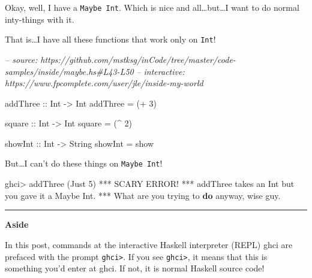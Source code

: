 \documentclass[]{article}
\newenvironment{Shaded}{}{}
\newcommand{\CommentTok}[1]{\textcolor[rgb]{0.38,0.63,0.69}{\textit{#1}}}
\newcommand{\DataTypeTok}[1]{\textcolor[rgb]{0.56,0.13,0.00}{#1}}
\newcommand{\DecValTok}[1]{\textcolor[rgb]{0.25,0.63,0.44}{#1}}
\newcommand{\FunctionTok}[1]{\textcolor[rgb]{0.02,0.16,0.49}{#1}}
\newcommand{\KeywordTok}[1]{\textcolor[rgb]{0.00,0.44,0.13}{\textbf{#1}}}
\newcommand{\NormalTok}[1]{#1}
\newcommand{\OtherTok}[1]{\textcolor[rgb]{0.00,0.44,0.13}{#1}}
\begin{document}
Okay, well, I have a \texttt{Maybe\ Int}. Which is nice and
all\ldots{}but\ldots{}I want to do normal inty-things with it.

That is\ldots{}I have all these functions that work only on \texttt{Int}!

\begin{Shaded}
\begin{Highlighting}[]
\CommentTok{-- source: https://github.com/mstksg/inCode/tree/master/code-samples/inside/maybe.hs#L43-L50}
\CommentTok{-- interactive: https://www.fpcomplete.com/user/jle/inside-my-world}

\OtherTok{addThree ::} \DataTypeTok{Int} \OtherTok{->} \DataTypeTok{Int}
\NormalTok{addThree }\FunctionTok{=}\NormalTok{ (}\FunctionTok{+} \DecValTok{3}\NormalTok{)}

\OtherTok{square ::} \DataTypeTok{Int} \OtherTok{->} \DataTypeTok{Int}
\NormalTok{square }\FunctionTok{=}\NormalTok{ (}\FunctionTok{^} \DecValTok{2}\NormalTok{)}

\NormalTok{showInt}\OtherTok{ ::} \DataTypeTok{Int} \OtherTok{->} \DataTypeTok{String}
\NormalTok{showInt }\FunctionTok{=}\NormalTok{ show}
\end{Highlighting}
\end{Shaded}

But\ldots{}I can't do these things on \texttt{Maybe\ Int}!

\begin{Shaded}
\begin{Highlighting}[]
\NormalTok{ghci}\FunctionTok{>}\NormalTok{ addThree (}\DataTypeTok{Just} \DecValTok{5}\NormalTok{)}
\FunctionTok{***} \DataTypeTok{SCARY} \DataTypeTok{ERROR}\FunctionTok{!}
\FunctionTok{***}\NormalTok{ addThree takes an }\DataTypeTok{Int}\NormalTok{ but you gave it a }\DataTypeTok{Maybe} \DataTypeTok{Int}\FunctionTok{.}
\FunctionTok{***} \DataTypeTok{What}\NormalTok{ are you trying to }\KeywordTok{do}\NormalTok{ anyway, wise guy}\FunctionTok{.}
\end{Highlighting}
\end{Shaded}

\begin{center}\rule{0.5\linewidth}{\linethickness}\end{center}

\textbf{Aside}

In this post, commands at the interactive Haskell interpreter (REPL) ghci are
prefaced with the prompt \texttt{ghci\textgreater{}}. If you see
\texttt{ghci\textgreater{}}, it means that this is something you'd enter at
ghci. If not, it is normal Haskell source code!
\end{document}
